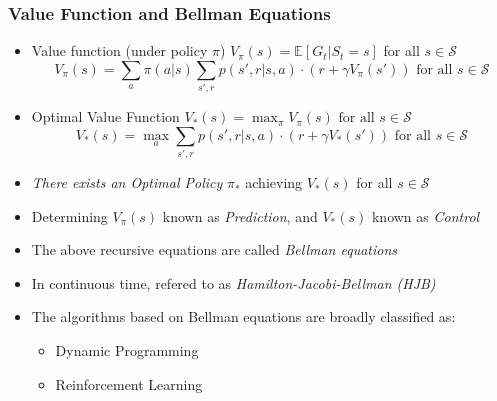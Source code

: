 \documentclass[handout]{beamer}
\begin{document}
\begin{frame}
\frametitle{Value Function and Bellman Equations}
\pause
\begin{itemize}
\item Value function (under policy $\pi$) $V_{\pi}(s) = \mathbb{E}[G_t|S_t = s]$ for all $s \in \mathcal{S}$
\pause
$$V_{\pi}(s) = \sum_{a} \pi(a|s) \sum_{s',r} p(s',r|s,a) \cdot (r + \gamma V_{\pi}(s')) \mbox{ for all } s \in \mathcal{S}$$
\pause
\item Optimal Value Function $V_{*}(s) = \max_{\pi} V_{\pi}(s) \mbox{ for all } s \in \mathcal{S}$
\pause
$$V_{*}(s) = \max_{a} \sum_{s',r} p(s',r|s,a) \cdot (r + \gamma V_{*}(s')) \mbox{ for all } s \in \mathcal{S}$$
\pause
\item {\em There exists an Optimal Policy} $\pi_{*}$ achieving $V_{*}(s)$ for all $s \in \mathcal{S}$
\pause
\item Determining $V_{\pi}(s)$ known as {\em Prediction}, and $V_{*}(s)$ known as {\em Control}
\pause
\item The above recursive equations are called {\em Bellman equations}
\pause
\item In continuous time, refered to as {\em Hamilton-Jacobi-Bellman (HJB)}
\pause
\item The algorithms based on Bellman equations are broadly classified as:
\begin{itemize}
\item Dynamic Programming
\item Reinforcement Learning
\end{itemize}

\end{itemize}
\end{frame}
\end{document}
